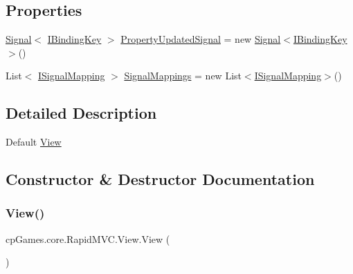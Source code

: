 \subsection*{Properties}
\begin{DoxyCompactItemize}
\item 
\mbox{\hyperlink{classcp_games_1_1core_1_1_rapid_m_v_c_1_1_signal}{Signal}}$<$ \mbox{\hyperlink{interfacecp_games_1_1core_1_1_rapid_m_v_c_1_1_i_binding_key}{I\+Binding\+Key}} $>$ \mbox{\hyperlink{classcp_games_1_1core_1_1_rapid_m_v_c_1_1_view_ab8e01d990df4516ff4591df6277edf63}{Property\+Updated\+Signal}} = new \mbox{\hyperlink{classcp_games_1_1core_1_1_rapid_m_v_c_1_1_signal}{Signal}}$<$\mbox{\hyperlink{interfacecp_games_1_1core_1_1_rapid_m_v_c_1_1_i_binding_key}{I\+Binding\+Key}}$>$()
\item 
List$<$ \mbox{\hyperlink{interfacecp_games_1_1core_1_1_rapid_m_v_c_1_1impl_1_1_i_signal_mapping}{I\+Signal\+Mapping}} $>$ \mbox{\hyperlink{classcp_games_1_1core_1_1_rapid_m_v_c_1_1_view_a70d45752cc44bbac2011ea458ee01230}{Signal\+Mappings}} = new List$<$\mbox{\hyperlink{interfacecp_games_1_1core_1_1_rapid_m_v_c_1_1impl_1_1_i_signal_mapping}{I\+Signal\+Mapping}}$>$()
\end{DoxyCompactItemize}


\subsection{Detailed Description}
Default \mbox{\hyperlink{classcp_games_1_1core_1_1_rapid_m_v_c_1_1_view}{View}} 



\subsection{Constructor \& Destructor Documentation}
\mbox{\label{classcp_games_1_1core_1_1_rapid_m_v_c_1_1_view_a40db8f93a7952a91c90183ded2f44640}} 
\subsubsection{\texorpdfstring{View()}{View()}}
{\footnotesize\ttfamily cp\+Games.\+core.\+Rapid\+M\+V\+C.\+View.\+View (\begin{DoxyParamCaption}{ }\end{DoxyParamCaption})\hspace{0.3cm}{\ttfamily [protected]}}



